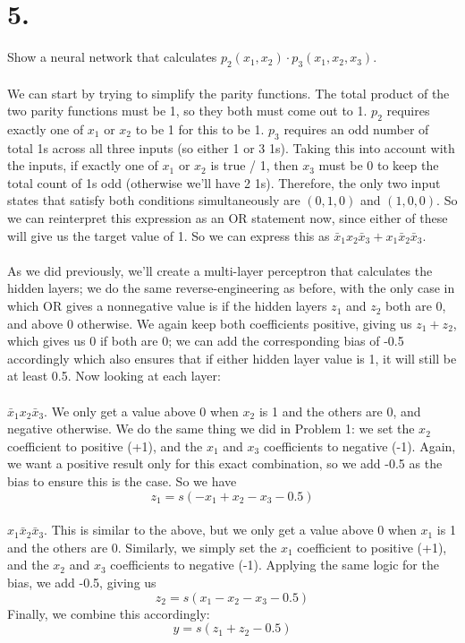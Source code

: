 \documentclass{article}
\begin{document}
{\Large 

\section*{5.}
Show a neural network that calculates \(p_2(x_1, x_2) \cdot p_3(x_1, x_2, x_3)\). \\ \\
We can start by trying to simplify the parity functions. The total product of the two parity functions must be 1, so they both must come out to 1. \(p_2\) requires exactly one of \(x_1\) or \(x_2\) to be 1 for this to be 1. \(p_3\) requires an odd number of total 1s across all three inputs (so either 1 or 3 1s). Taking this into account with the inputs, if exactly one of \(x_1\) or \(x_2\) is true / 1, then \(x_3\) must be 0 to keep the total count of 1s odd (otherwise we'll have 2 1s). Therefore, the only two input states that satisfy both conditions simultaneously are \((0, 1, 0)\) and \((1, 0, 0)\). So we can reinterpret this expression as an OR statement now, since either of these will give us the target value of 1. So we can express this as \(\bar{x}_1 x_2 \bar{x}_3 + x_1 \bar{x}_2 \bar{x}_3\). \\ \\
As we did previously, we'll create a multi-layer perceptron that calculates the hidden layers; we do the same reverse-engineering as before, with the only case in which OR gives a nonnegative value is if the hidden layers \(z_1\) and \(z_2\) both are 0, and above 0 otherwise. We again keep both coefficients positive, giving us \(z_1 + z_2\), which gives us 0 if both are 0; we can add the corresponding bias of -0.5 accordingly which also ensures that if either hidden layer value is 1, it will still be at least 0.5. Now looking at each layer: \\ \\
\(\bar{x}_1 x_2 \bar{x}_3\). We only get a value above 0 when \(x_2\) is 1 and the others are 0, and negative otherwise. We do the same thing we did in Problem 1: we set the \(x_2\) coefficient to positive (+1), and the \(x_1\) and \(x_3\) coefficients to negative (-1). Again, we want a positive result only for this exact combination, so we add -0.5 as the bias to ensure this is the case. So we have 
\[
  \boxed{z_1 = s(-x_1 + x_2 - x_3 - 0.5)}
\] \\
\(x_1 \bar{x}_2 \bar{x}_3\). This is similar to the above, but we only get a value above 0 when \(x_1\) is 1 and the others are 0. Similarly, we simply set the \(x_1\) coefficient to positive (+1), and the \(x_2\) and \(x_3\) coefficients to negative (-1). Applying the same logic for the bias, we add -0.5, giving us 
\[
  \boxed{z_2 = s(x_1 - x_2 - x_3 - 0.5)}
\]
Finally, we combine this accordingly:
\[
  \boxed{y = s(z_1 + z_2 - 0.5)}
\]

}
\end{document}
